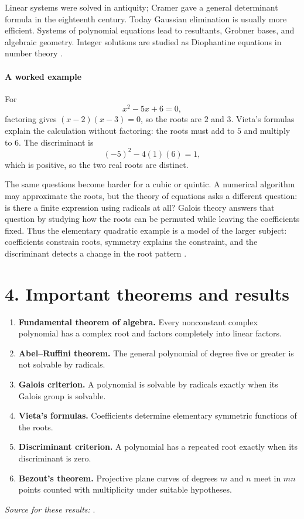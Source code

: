 Linear systems were solved in antiquity; Cramer gave a general determinant formula in the eighteenth century. Today Gaussian elimination is usually more efficient. Systems of polynomial equations lead to resultants, Grobner bases, and algebraic geometry. Integer solutions are studied as Diophantine equations in number theory \cite{equations_ref3}.

\paragraph{A worked example}
For
\[
x^2-5x+6=0,
\]
factoring gives $(x-2)(x-3)=0$, so the roots are $2$ and $3$. Vieta's
formulas explain the calculation without factoring: the roots must add to
$5$ and multiply to $6$. The discriminant is
\[
(-5)^2-4(1)(6)=1,
\]
which is positive, so the two real roots are distinct.

The same questions become harder for a cubic or quintic. A numerical
algorithm may approximate the roots, but the theory of equations asks a
different question: is there a finite expression using radicals at all?
Galois theory answers that question by studying how the roots can be
permuted while leaving the coefficients fixed. Thus the elementary quadratic
example is a model of the larger subject: coefficients constrain roots,
symmetry explains the constraint, and the discriminant detects a change in
the root pattern \cite{equations_ref1,equations_ref2}.

\section*{4. Important theorems and results}
\begin{enumerate}[leftmargin=*,itemsep=0.35em]
\item \textbf{Fundamental theorem of algebra.} Every nonconstant complex polynomial has a complex root and factors completely into linear factors.

\item \textbf{Abel--Ruffini theorem.} The general polynomial of degree five or greater is not solvable by radicals.

\item \textbf{Galois criterion.} A polynomial is solvable by radicals exactly when its Galois group is solvable.

\item \textbf{Vieta's formulas.} Coefficients determine elementary symmetric functions of the roots.

\item \textbf{Discriminant criterion.} A polynomial has a repeated root exactly when its discriminant is zero.

\item \textbf{Bezout's theorem.} Projective plane curves of degrees $m$ and $n$ meet in $mn$ points counted with multiplicity under suitable hypotheses.
\end{enumerate}
\noindent\emph{Source for these results:} \cite{equations_ref1}.

